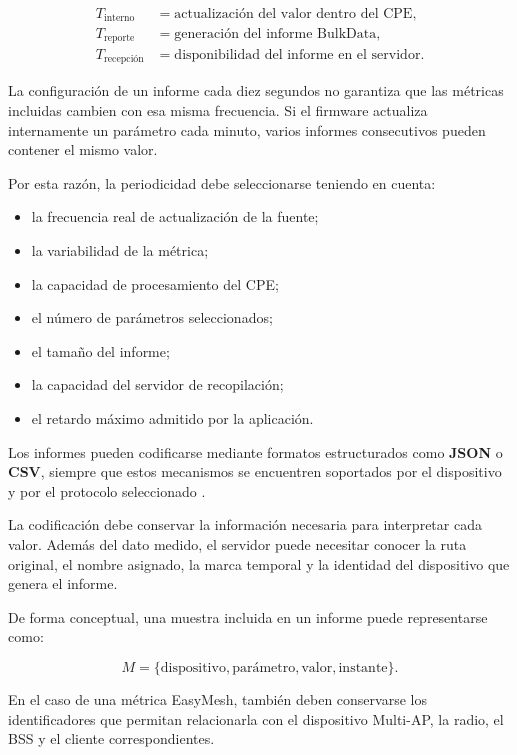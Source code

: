 \[
\begin{aligned}
    T_{\mathrm{interno}}
    &=
    \text{actualización del valor dentro del CPE},\\
    T_{\mathrm{reporte}}
    &=
    \text{generación del informe BulkData},\\
    T_{\mathrm{recepción}}
    &=
    \text{disponibilidad del informe en el servidor}.
\end{aligned}
\]

La configuración de un informe cada diez segundos no garantiza que las
métricas incluidas cambien con esa misma frecuencia. Si el firmware
actualiza internamente un parámetro cada minuto, varios informes
consecutivos pueden contener el mismo valor.

Por esta razón, la periodicidad debe seleccionarse teniendo en cuenta:

\begin{itemize}
    \item la frecuencia real de actualización de la fuente;
    \item la variabilidad de la métrica;
    \item la capacidad de procesamiento del CPE;
    \item el número de parámetros seleccionados;
    \item el tamaño del informe;
    \item la capacidad del servidor de recopilación;
    \item el retardo máximo admitido por la aplicación.
\end{itemize}

Los informes pueden codificarse mediante formatos estructurados como
\textbf{JSON} o \textbf{CSV}, siempre que estos mecanismos se encuentren
soportados por el dispositivo y por el protocolo seleccionado
\cite{bbf_tr181}.

La codificación debe conservar la información necesaria para interpretar
cada valor. Además del dato medido, el servidor puede necesitar conocer
la ruta original, el nombre asignado, la marca temporal y la identidad del
dispositivo que genera el informe.

De forma conceptual, una muestra incluida en un informe puede
representarse como:

\[
    M =
    \{
        \text{dispositivo},
        \text{parámetro},
        \text{valor},
        \text{instante}
    \}.
\]

En el caso de una métrica EasyMesh, también deben conservarse los
identificadores que permitan relacionarla con el dispositivo Multi-AP, la
radio, el BSS y el cliente correspondientes.

